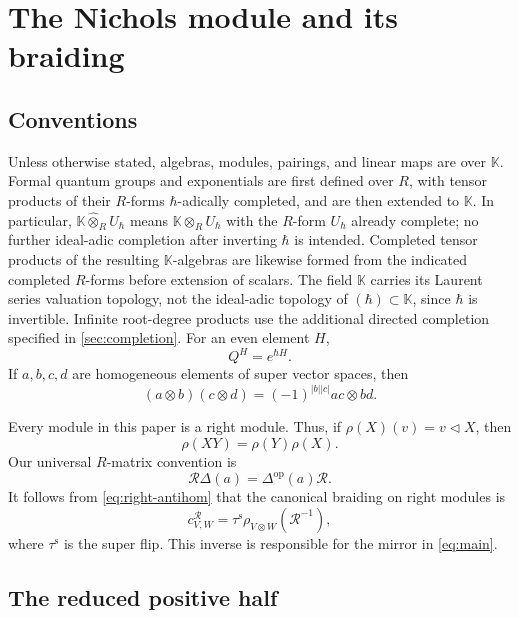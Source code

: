 \documentclass[11pt,a4paper]{article}
\newcommand{\hK}{\mathbb K}
\newcommand{\ot}{\otimes}
\newcommand{\hot}{\widehat\otimes}
\newcommand{\tri}{\mathbin{\triangleleft}}
\theoremstyle{definition}
\theoremstyle{remark}
\begin{document}
\section{The Nichols module and its braiding}
\subsection{Conventions}\label{sec:conventions}

Unless otherwise stated, algebras, modules, pairings, and linear maps
are over \(\hK\).  Formal quantum groups and exponentials are first
defined over \(R\), with tensor products of their \(R\)-forms
\(\hbar\)-adically completed, and are then extended to \(\hK\).
In particular, \(\hK\hot_R U_\hbar\) means
\(\hK\ot_R U_\hbar\) with the \(R\)-form \(U_\hbar\) already
complete; no further ideal-adic completion after inverting \(\hbar\)
is intended.  Completed tensor products of the resulting
\(\hK\)-algebras are likewise formed from the indicated completed
\(R\)-forms before extension of scalars.  The field \(\hK\) carries
its Laurent series valuation topology, not the ideal-adic topology
of \((\hbar)\subset\hK\), since \(\hbar\) is invertible.
Infinite root-degree products use the additional directed completion
specified in \cref{sec:completion}.  For an even element \(H\),
\[
 Q^H=e^{\hbar H}.
\]
If \(a,b,c,d\) are homogeneous elements of super vector spaces, then
\begin{equation}\label{eq:koszul}
 (a\ot b)(c\ot d)=(-1)^{|b||c|}ac\ot bd.
\end{equation}

Every module in this paper is a right module.  Thus, if
\(\rho(X)(v)=v\tri X\), then
\begin{equation}\label{eq:right-antihom}
 \rho(XY)=\rho(Y)\rho(X).
\end{equation}
Our universal \(R\)-matrix convention is
\begin{equation}\label{eq:R-convention}
 \mathcal R\Delta(a)=\Delta^{\mathrm{op}}(a)\mathcal R.
\end{equation}
It follows from \eqref{eq:right-antihom} that the canonical braiding on
right modules is
\begin{equation}\label{eq:right-braiding}
 c^{\mathcal R}_{V,W}
 =\tau^{\mathrm s}\rho_{V\ot W}(\mathcal R^{-1}),
\end{equation}
where \(\tau^{\mathrm s}\) is the super flip.  This inverse is responsible
for the mirror in \cref{eq:main}.

\subsection{The reduced positive half}
\label{sec:reduced}
\end{document}
